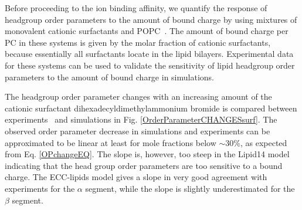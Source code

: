 \documentclass[aip,jcp,twocolumn]{revtex4}
\begin{document}
Before proceeding to the ion binding affinity, we quantify
the response of headgroup order parameters to the amount of 
bound charge by using mixtures of monovalent cationic surfactants
and POPC~\cite{scherer89}. The amount of bound charge per PC 
in these systems is given by the molar fraction of cationic 
surfactants, because essentially all surfactants locate in the 
lipid bilayers. Experimental data for these systems can be used to validate 
the sensitivity of lipid headgroup order parameters
to the amount of bound charge in simulations.

%

The headgroup order parameter changes with an increasing amount of 
the cationic surfactant dihexadecyldimethylammonium bromide 
is compared between experiments~\cite{scherer89} and simulations in
Fig. \ref{OrderParameterCHANGESsurf}. 
The observed order parameter decrease in simulations and experiments
can be approximated to be linear at least for mole fractions
below $\sim$30\%, as expected from Eq. \ref{OPchangeEQ}.
The slope is, however, too steep in the Lipid14 model indicating that 
the head group order parameters are too sensitive to a bound charge.
The ECC-lipids model gives a slope in very good agreement with experiments
for the $\alpha$ segment, while the slope is slightly
underestimated for the $\beta$ segment.
\end{document}
